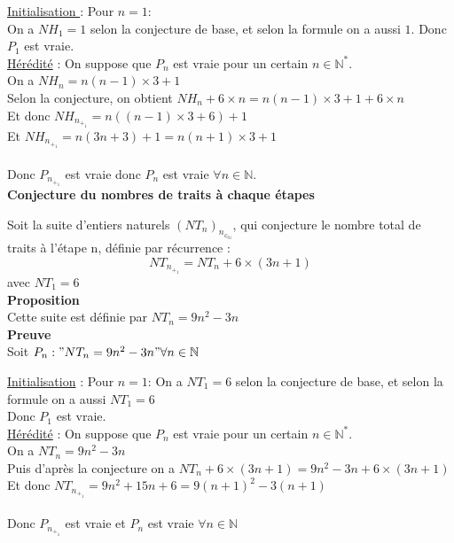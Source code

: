 \documentclass{book}
\begin{document}
\begin{appendices}
{\noindent \underline{Initialisation }} : Pour $n=1$:\\
On a $NH_1 = 1$ selon la conjecture de base, et selon la formule on a aussi $1$. 
Donc $P_1$ est vraie. \\

{\noindent \underline{Hérédité}} : On suppose que $P_n$ est vraie pour un certain $n \in \mathbb{N}^*$. \\

{\noindent On a $NH_n = n(n-1) \times 3+1$ }\\
Selon la conjecture, on obtient $NH_n + 6 \times n = n(n-1) \times 3 +1 + 6 \times n$\\
Et donc $NH_n_+_1 = n((n-1) \times 3 +6)+1$\\
Et $NH_n_+_1 = n(3n+3)+1 = n(n+1)\times 3 +1$\\\\
Donc $P_n_+_1$ est vraie donc $P_n$ est vraie $\forall n  \in \mathbb{N}$. \\

\textbf{\Large Conjecture du nombres de traits à chaque étapes \\}

{\noindent Soit la suite d'entiers naturels $(NT_n)_n_\in_\mathbb{N}$, qui conjecture le nombre total de traits à l'étape n, définie par récurrence :}
$$NT_n_+_1=NT_n + 6 \times (3n + 1)$$
avec $NT_1 = 6$ \\

{\noindent \textbf{Proposition \\}}
Cette suite est définie par $NT_n = 9n^2-3n$ \\

{\noindent \textbf{Preuve \\}}
Soit $P_n : "NT_n = 9n^2-3n" \forall n \in \mathbb{N}$ \

{\noindent \underline{Initialisation}} : Pour $n=1$:
On a $NT_1 = 6$ selon la conjecture de base, et selon la formule on a aussi $NT_1 = 6$\\
Donc $P_1$ est vraie. \\

{\noindent \underline{Hérédité}} : On suppose que $P_n$ est vraie pour un certain $n \in \mathbb{N}^*$.\\
On a $NT_n = 9n^2-3n$\\
Puis d'après la conjecture on a $NT_n + 6 \times (3n + 1) = 9n^2-3n + 6 \times (3n + 1)$\\
Et donc $NT_n_+_1 =  9n^2+15n+6=9(n+1)^2-3(n+1)$\\\\
Donc $P_n_+_1$ est vraie et $P_n$ est vraie $\forall n \in \mathbb{N}$\\



\end{appendices}
\end{document}
